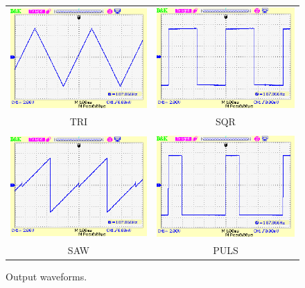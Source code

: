 \begin{figure}
\centering\begin{tabular}{cc}
\includegraphics[scale=0.65]{bk3.png} & \includegraphics[scale=0.65]{bk5.png}\\
TRI & SQR \\
\strut & \\
\includegraphics[scale=0.65]{bk4.png} & \includegraphics[scale=0.65]{bk6.png}\\
SAW & PULS
\end{tabular}\par
\caption{Output waveforms.}\label{fig:output-examples}
\end{figure}

